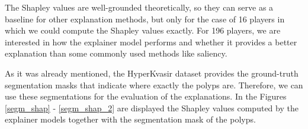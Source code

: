 \documentclass[magisterska,en]{pracamgr}
\begin{document}
The Shapley values are well-grounded theoretically, so they can serve as a baseline for other explanation methods, but only for the case of 16 players in which we could compute the Shapley values exactly. For 196 players, we are interested in how the explainer model performs and whether it provides a better explanation than some commonly used methods like saliency.





As it was already mentioned, the HyperKvasir dataset provides the ground-truth segmentation masks that indicate where exactly the polyps are. Therefore, we can use these segmentations for the evaluation of the explanations. 
In the Figures \ref{segm_shap} - \ref{segm_shap_2} are displayed the Shapley values computed by the explainer models together with the segmentation mask of the polyps.

\pagebreak
\end{document}
